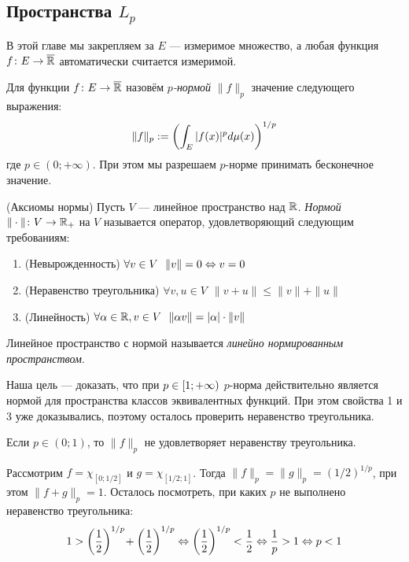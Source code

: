 \subsection{Пространства $L_p$}

\begin{note}
	В этой главе мы закрепляем за $E$ --- измеримое множество, а любая функция $f \colon E \to \overline{\mathbb{R}}$ автоматически считается измеримой.
\end{note}

\begin{definition}
	Для функции $f \colon E \to \overline{\mathbb{R}}$ назовём \textit{$p$-нормой} $\|f\|_p$ значение следующего выражения:
	\[
		\|f\|_p := \left(\int_E |f(x)|^pd\mu(x)\right)^{1/p}
	\]
	где $p \in (0; +\infty)$. При этом мы разрешаем $p$-норме принимать бесконечное значение.
\end{definition}

\begin{reminder} (Аксиомы нормы)
	Пусть $V$ --- линейное пространство над $\mathbb{R}$. \textit{Нормой}\\ $\|\cdot\| \colon V \to \mathbb{R}_+$ на $V$ называется оператор, удовлетворяющий следующим требованиям:
	\begin{enumerate}
		\item (Невырожденность) \(\forall v \in V\ \ \|v\| = 0 \Lra v = 0\)
		
		\item (Неравенство треугольника) \(\forall v, u \in V\ \ \|v + u\| \le \|v\| + \|u\|\)
		
		\item (Линейность) \(\forall \alpha \in \mathbb{R}, v \in V\ \ \|\alpha v\| = |\alpha| \cdot \|v\|\)
	\end{enumerate}
	Линейное пространство с нормой называется \textit{линейно нормированным пространством}.
\end{reminder}

\begin{note}
	Наша цель --- доказать, что при $p \in \left[1; +\infty\right)$ $p$-норма действительно является нормой для пространства классов эквивалентных функций. При этом свойства 1 и 3 уже доказывались, поэтому осталось проверить неравенство треугольника.
\end{note}

\begin{note}
	Если $p \in (0; 1)$, то $\|f\|_p$ не удовлетворяет неравенству треугольника.
	
	Рассмотрим $f = \chi_{[0; 1/2]}$ и $g = \chi_{[1/2; 1]}$. Тогда $\|f\|_p = \|g\|_p = (1/2)^{1/p}$, при этом $\|f + g\|_p = 1$. Осталось посмотреть, при каких $p$ не выполнено неравенство треугольника:
	\[
		1 > \left(\frac{1}{2}\right)^{1/p} \! + \left(\frac{1}{2}\right)^{1/p} \Leftrightarrow \left(\frac{1}{2}\right)^{1/p} < \frac{1}{2} \Leftrightarrow \frac{1}{p} > 1 \Leftrightarrow p < 1 
	\]
\end{note}

